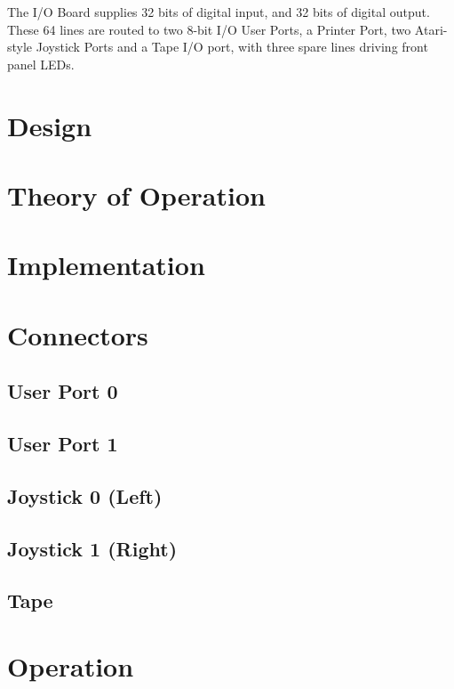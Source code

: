 

The I/O Board supplies 32 bits of digital input, and 32 bits of digital
output. These 64 lines are routed to two 8-bit I/O User Ports, a Printer Port,
two Atari-style Joystick Ports and a Tape I/O port, with three spare lines
driving front panel LEDs.

\section{Design}

\section{Theory of Operation}

\section{Implementation}

\section{Connectors}
\subsection{User Port 0}
\subsection{User Port 1}
\subsection{Joystick 0 (Left)}
\subsection{Joystick 1 (Right)}
\subsection{Tape}

\section{Operation}

